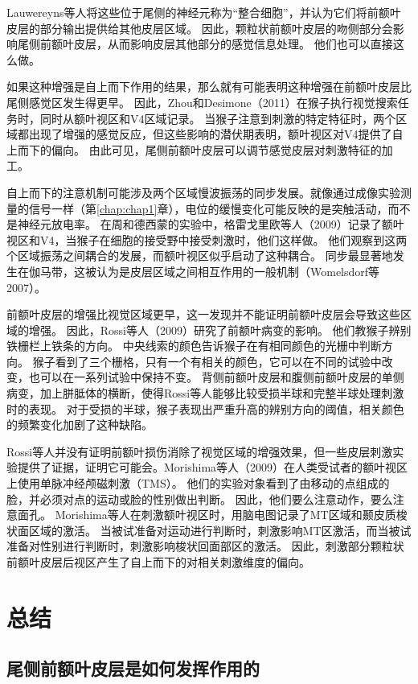 Lauwereyns等人将这些位于尾侧的神经元称为“整合细胞”，并认为它们将前额叶皮层的部分输出提供给其他皮层区域。
因此，颗粒状前额叶皮层的吻侧部分会影响尾侧前额叶皮层，从而影响皮层其他部分的感觉信息处理。
他们也可以直接这么做。


如果这种增强是自上而下作用的结果，那么就有可能表明这种增强在前额叶皮层比尾侧感觉区发生得更早。
因此，Zhou和Desimone（2011）在猴子执行视觉搜索任务时，同时从额叶视区和V4区域记录。
当猴子注意到刺激的特定特征时，两个区域都出现了增强的感觉反应，但这些影响的潜伏期表明，额叶视区对V4提供了自上而下的偏向。
由此可见，尾侧前额叶皮层可以调节感觉皮层对刺激特征的加工。


自上而下的注意机制可能涉及两个区域慢波振荡的同步发展。就像通过成像实验测量的信号一样（第\ref{chap:chap1}章），电位的缓慢变化可能反映的是突触活动，而不是神经元放电率。
在周和德西蒙的实验中，格雷戈里欧等人（2009）记录了额叶视区和V4，当猴子在细胞的接受野中接受刺激时，他们这样做。
他们观察到这两个区域振荡之间耦合的发展，而额叶视区似乎启动了这种耦合。
同步最显著地发生在伽马带，这被认为是皮层区域之间相互作用的一般机制（Womelsdorf等 2007）。


前额叶皮层的增强比视觉区域更早，这一发现并不能证明前额叶皮层会导致这些区域的增强。
因此，Rossi等人（2009）研究了前额叶病变的影响。
他们教猴子辨别铁栅栏上铁条的方向。
中央线索的颜色告诉猴子在有相同颜色的光栅中判断方向。
猴子看到了三个栅格，只有一个有相关的颜色，它可以在不同的试验中改变，也可以在一系列试验中保持不变。
背侧前额叶皮层和腹侧前额叶皮层的单侧病变，加上胼胝体的横断，使得Rossi等人能够比较受损半球和完整半球处理刺激时的表现。
对于受损的半球，猴子表现出严重升高的辨别方向的阈值，相关颜色的频繁变化加剧了这种缺陷。


Rossi等人并没有证明前额叶损伤消除了视觉区域的增强效果，但一些皮层刺激实验提供了证据，证明它可能会。Morishima等人（2009）在人类受试者的额叶视区上使用单脉冲经颅磁刺激（TMS）。
他们的实验对象看到了由移动的点组成的脸，并必须对点的运动或脸的性别做出判断。
因此，他们要么注意动作，要么注意面孔。
Morishima等人在刺激额叶视区时，用脑电图记录了MT区域和颞皮质梭状面区域的激活。
当被试准备对运动进行判断时，刺激影响MT区激活，而当被试准备对性别进行判断时，刺激影响梭状回面部区的激活。
因此，刺激部分颗粒状前额叶皮层后视区产生了自上而下的对相关刺激维度的偏向。



\section{总结}

\subsection{尾侧前额叶皮层是如何发挥作用的}


